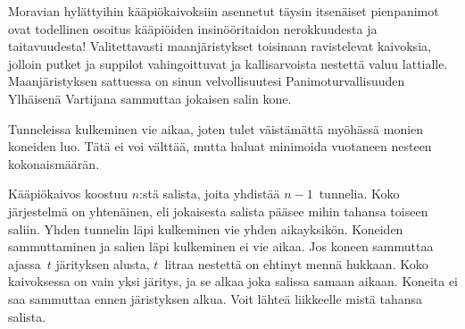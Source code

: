 
\noindent

Moravian hylättyihin kääpiökaivoksiin asennetut täysin itsenäiset pienpanimot ovat todellinen osoitus kääpiöiden insinööritaidon nerokkuudesta ja taitavuudesta!
Valitettavasti maanjäristykset toisinaan ravistelevat kaivoksia, jolloin putket ja suppilot vahingoittuvat ja kallisarvoista nestettä valuu lattialle.
Maanjäristyksen sattuessa on sinun velvollisuutesi Panimoturvallisuuden Ylhäisenä Vartijana sammuttaa jokaisen salin kone.


Tunneleissa kulkeminen vie aikaa,
joten tulet väistämättä myöhässä monien koneiden luo.
Tätä ei voi välttää, mutta haluat minimoida vuotaneen nesteen kokonaismäärän.

\medskip
Kääpiökaivos koostuu $n$:stä salista, joita yhdistää $n-1$~tunnelia.
Koko järjestelmä on yhtenäinen, eli jokaisesta salista pääsee mihin tahansa toiseen saliin.
Yhden tunnelin läpi kulkeminen vie yhden aikayksikön.
Koneiden sammuttaminen ja salien läpi kulkeminen ei vie aikaa.
Jos koneen sammuttaa ajassa~$t$ järityksen alusta, $t$~litraa nestettä on ehtinyt mennä hukkaan.
Koko kaivoksessa on vain yksi järitys, ja se alkaa joka salissa samaan aikaan. Koneita ei saa sammuttaa ennen järistyksen alkua.
Voit lähteä liikkeelle mistä tahansa salista.

